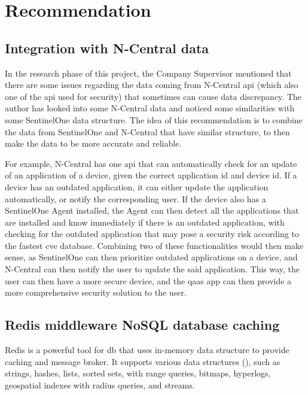 \section{Recommendation}

\subsection{Integration with N-Central data}

In the research phase of this project, the Company Supervisor mentioned that there are some issues regarding the data coming
from N-Central \acrshort{api} (which also one of the \acrshort{api} used for security) that sometimes can cause data discrepancy. The author
has looked into some N-Central data and noticed some similarities with some SentinelOne data structure. The idea of this recommendation
is to combine the data from SentinelOne and N-Central that have similar structure, to then make the data to be more accurate and reliable.

For example, N-Central has one \acrshort{api} that can automatically check for an update of an application
of a device, given the correct application \acrshort{id} and device \acrshort{id}. If a device has an outdated application, it can either
update the application automatically, or notify the corresponding user. If the device also has a SentinelOne Agent installed, the Agent
can then detect all the applications that are installed and know immediately if there is an outdated application, with checking for the
outdated application that may pose a security risk according to the fastest \acrshort{cve} database. Combining two of these functionalities
would then make sense, as SentinelOne can then prioritize outdated applications on a device, and N-Central can then notify the user
to update the said application. This way, the user can then have a more secure device, and the \acrshort{qaas} app can then provide a more
comprehensive security solution to the user.

\subsection{Redis middleware NoSQL database caching}

Redis is a powerful tool for \acrshort{db} that uses in-memory data structure to provide caching and message broker. It supports
various data structures (\textit{\cite{redisDataStructure}}), such as strings, hashes, lists, sorted sets, with range queries,
bitmaps, hyperlogs, geospatial indexes with radius queries, and streams.

